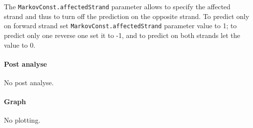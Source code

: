 The \texttt{MarkovConst.affectedStrand} parameter allows to specify the affected strand and thus to turn off the prediction on the opposite strand.
To predict only on forward strand set \texttt{MarkovConst.affectedStrand} parameter value to 1;
to predict only one reverse one set it to -1, and to predict on both strands let the value to 0.

\paragraph{Post analyse}

No post analyse.

\paragraph{Graph}

No plotting.

